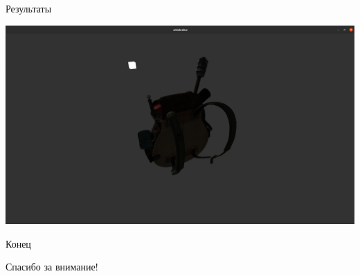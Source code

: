 \documentclass{beamer}
\begin{document}
\begin{frame}{Результаты}
    \begin{center}
    \includegraphics[width=1 \linewidth]{backpack_dark.png}
    \end{center}
\end{frame}

\begin{frame}{Конец}
    \begin{center}
    Спасибо за внимание!
    \end{center}
\end{frame}
\end{document}
